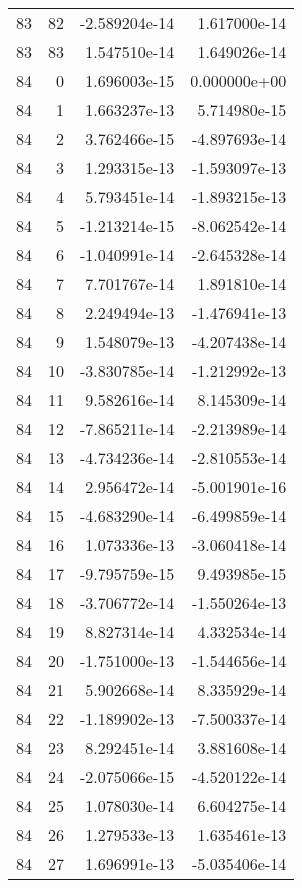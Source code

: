 \begin{tabular}{rrrr}
  83 &   82 & -2.589204e-14 &  1.617000e-14 \\
  83 &   83 &  1.547510e-14 &  1.649026e-14 \\
  84 &    0 &  1.696003e-15 &  0.000000e+00 \\
  84 &    1 &  1.663237e-13 &  5.714980e-15 \\
  84 &    2 &  3.762466e-15 & -4.897693e-14 \\
  84 &    3 &  1.293315e-13 & -1.593097e-13 \\
  84 &    4 &  5.793451e-14 & -1.893215e-13 \\
  84 &    5 & -1.213214e-15 & -8.062542e-14 \\
  84 &    6 & -1.040991e-14 & -2.645328e-14 \\
  84 &    7 &  7.701767e-14 &  1.891810e-14 \\
  84 &    8 &  2.249494e-13 & -1.476941e-13 \\
  84 &    9 &  1.548079e-13 & -4.207438e-14 \\
  84 &   10 & -3.830785e-14 & -1.212992e-13 \\
  84 &   11 &  9.582616e-14 &  8.145309e-14 \\
  84 &   12 & -7.865211e-14 & -2.213989e-14 \\
  84 &   13 & -4.734236e-14 & -2.810553e-14 \\
  84 &   14 &  2.956472e-14 & -5.001901e-16 \\
  84 &   15 & -4.683290e-14 & -6.499859e-14 \\
  84 &   16 &  1.073336e-13 & -3.060418e-14 \\
  84 &   17 & -9.795759e-15 &  9.493985e-15 \\
  84 &   18 & -3.706772e-14 & -1.550264e-13 \\
  84 &   19 &  8.827314e-14 &  4.332534e-14 \\
  84 &   20 & -1.751000e-13 & -1.544656e-14 \\
  84 &   21 &  5.902668e-14 &  8.335929e-14 \\
  84 &   22 & -1.189902e-13 & -7.500337e-14 \\
  84 &   23 &  8.292451e-14 &  3.881608e-14 \\
  84 &   24 & -2.075066e-15 & -4.520122e-14 \\
  84 &   25 &  1.078030e-14 &  6.604275e-14 \\
  84 &   26 &  1.279533e-13 &  1.635461e-13 \\
  84 &   27 &  1.696991e-13 & -5.035406e-14 \\

\end{tabular}
